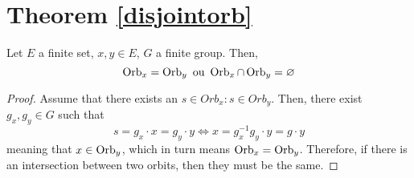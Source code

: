 \section{Theorem \ref{disjointorb}}
\begin{theorem*}
  Let $E$ a finite set, $x, y \in E$, $G$ a finite group. Then, 
  \[
    \operatorname{Orb}_x = \operatorname{Orb}_y \text{ ou } \operatorname{Orb}_x \cap \operatorname{Orb}_y = \varnothing
  \]
\end{theorem*}
\begin{proof}
  Assume that there exists an $s \in Orb_x : s \in Orb_y$. Then, there exist $g_x, g_y \in G$ such that
  \[
    s = g_x \cdot x = g_y \cdot y \Leftrightarrow x = g_x^{-1}g_y \cdot y = g \cdot y
  \]
  meaning that $x \in \operatorname{Orb}_y$, which in turn means $\operatorname{Orb}_x = \operatorname{Orb}_y$. Therefore, if there is an intersection between two orbits, then they must be the same. 
\end{proof}